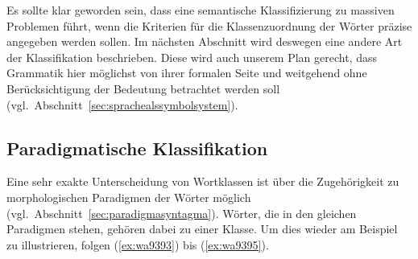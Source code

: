 Es sollte klar geworden sein, dass eine semantische Klassifizierung zu massiven Problemen führt, wenn die Kriterien für die Klassenzuordnung der Wörter präzise angegeben werden sollen.
Im nächsten Abschnitt wird deswegen eine andere Art der Klassifikation beschrieben.
Diese wird auch unserem Plan gerecht, dass Grammatik hier möglichst von ihrer formalen Seite und weitgehend ohne Berücksichtigung der Bedeutung betrachtet werden soll (vgl.\ Abschnitt~\ref{sec:sprachealssymbolsystem}).

\subsection{Paradigmatische Klassifikation}

\label{sec:paradigmatischeklassifikation}

Eine sehr exakte Unterscheidung von Wortklassen ist über die Zugehörigkeit zu morphologischen Paradigmen der Wörter möglich (vgl.\ Abschnitt~\ref{sec:paradigmasyntagma}).
Wörter, die in den gleichen Paradigmen stehen, gehören dabei zu einer Klasse.
Um dies wieder am Beispiel zu illustrieren, folgen (\ref{ex:wa9393}) bis (\ref{ex:wa9395}).

\begin{exe}
  \ex \label{ex:wa9393}
  \begin{xlist}
  \end{xlist}
  \ex \label{ex:wa9394}
  \begin{xlist}
  \end{xlist}
  \ex \label{ex:wa9395}
  \begin{xlist}
  \end{xlist}
\end{exe}

